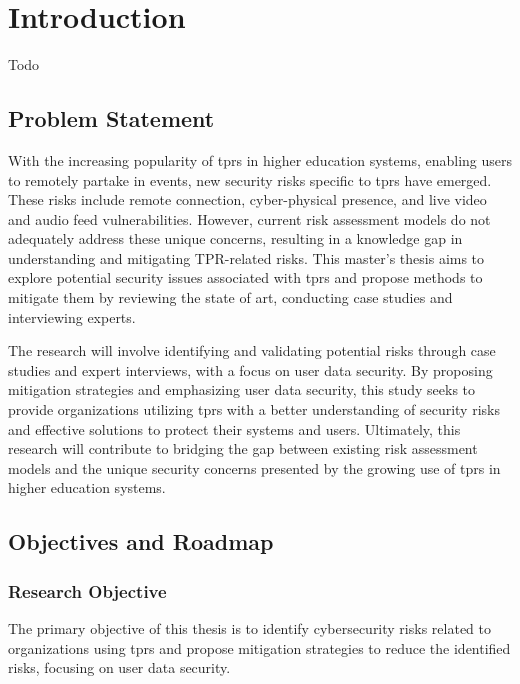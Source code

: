 
\newpage
\section{Introduction}

Todo

\subsection{Problem Statement}

With the increasing popularity of \ac{tprs} in higher education systems, enabling users to remotely partake in events, new security risks specific to \ac{tprs} have emerged.
These risks include remote connection, cyber-physical presence, and live video and audio feed vulnerabilities.
However, current risk assessment models do not adequately address these unique concerns, resulting in a knowledge gap in understanding and mitigating TPR-related risks.
This master's thesis aims to explore potential security issues associated with \ac{tprs} and propose methods to mitigate them by
reviewing the state of art, conducting case studies and interviewing experts.

The research will involve identifying and validating potential risks through case studies and expert interviews, with a focus on user data security.
By proposing mitigation strategies and emphasizing user data security, this study seeks to provide organizations utilizing \ac{tprs} with a better understanding of security risks and effective solutions to protect their systems and users.
Ultimately, this research will contribute to bridging the gap between existing risk assessment models and the unique security concerns presented by the growing use of \ac{tprs} in higher education systems.

\subsection{Objectives and Roadmap}\label{subsec:objectives-and-roadmap}


\subsubsection{Research Objective}

The primary objective of this thesis is to identify cybersecurity risks related to organizations using \ac{tprs} and propose mitigation strategies to reduce the identified risks, focusing on user data security.

